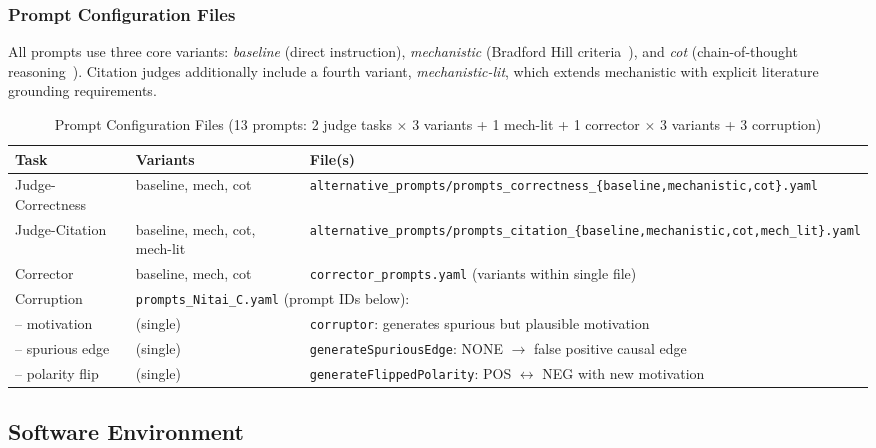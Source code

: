 \subsubsection{Prompt Configuration Files}

All prompts use three core variants: \textit{baseline} (direct instruction), \textit{mechanistic} (Bradford Hill criteria~\cite{shimonovich2020bradford}), and \textit{cot} (chain-of-thought reasoning~\cite{kojima2022large}). Citation judges additionally include a fourth variant, \textit{mechanistic-lit}, which extends mechanistic with explicit literature grounding requirements.

\begin{table}[H]
\centering
\caption{Prompt Configuration Files (13 prompts: 2 judge tasks $\times$ 3 variants + 1 mech-lit + 1 corrector $\times$ 3 variants + 3 corruption)}
\label{tab:prompt_files}
\footnotesize
\begin{tabularx}{\textwidth}{@{}l l X@{}}
\toprule
\textbf{Task} & \textbf{Variants} & \textbf{File(s)} \\
\midrule
Judge-Correctness & baseline, mech, cot & \texttt{alternative\_prompts/prompts\_correctness\_\{baseline,mechanistic,cot\}.yaml} \\
Judge-Citation & baseline, mech, cot, mech-lit & \texttt{alternative\_prompts/prompts\_citation\_\{baseline,mechanistic,cot,mech\_lit\}.yaml} \\
Corrector & baseline, mech, cot & \texttt{corrector\_prompts.yaml} (variants within single file) \\
\midrule
Corruption & \multicolumn{2}{l}{\texttt{prompts\_Nitai\_C.yaml} (prompt IDs below):} \\
\quad -- motivation & (single) & \texttt{corruptor}: generates spurious but plausible motivation \\
\quad -- spurious edge & (single) & \texttt{generateSpuriousEdge}: NONE $\rightarrow$ false positive causal edge \\
\quad -- polarity flip & (single) & \texttt{generateFlippedPolarity}: POS $\leftrightarrow$ NEG with new motivation \\
\bottomrule
\end{tabularx}
\end{table}

\subsection{Software Environment}
\label{sec:software_env}

